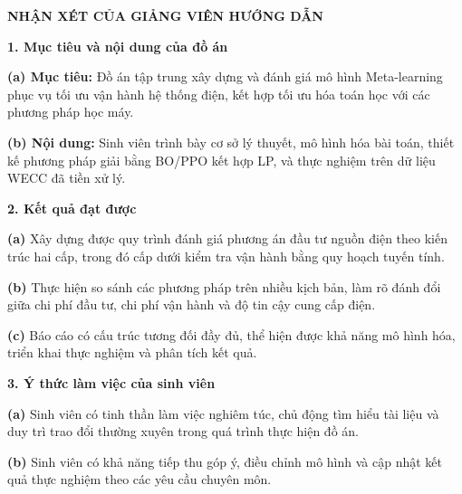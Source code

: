 \documentclass[12pt, a4paper]{report}
\begin{document}
\newpage
\thispagestyle{empty}

\vspace*{1.4cm}
\begin{center}
  {\fontsize{14}{17}\selectfont\bfseries NHẬN XÉT CỦA GIẢNG VIÊN HƯỚNG DẪN}
\end{center}
\vspace{0.5cm}

\begingroup
{}
\setlength{\parindent}{0pt}
\small

\textbf{1. Mục tiêu và nội dung của đồ án}

\hspace*{0.7cm}\textbf{(a) Mục tiêu:} Đồ án tập trung xây dựng và đánh giá mô hình Meta-learning phục vụ tối ưu vận hành hệ thống điện, kết hợp tối ưu hóa toán học với các phương pháp học máy.

\hspace*{0.7cm}\textbf{(b) Nội dung:} Sinh viên trình bày cơ sở lý thuyết, mô hình hóa bài toán, thiết kế phương pháp giải bằng BO/PPO kết hợp LP, và thực nghiệm trên dữ liệu WECC đã tiền xử lý.

\vspace{0.25cm}
\textbf{2. Kết quả đạt được}

\hspace*{0.7cm}\textbf{(a)} Xây dựng được quy trình đánh giá phương án đầu tư nguồn điện theo kiến trúc hai cấp, trong đó cấp dưới kiểm tra vận hành bằng quy hoạch tuyến tính.

\hspace*{0.7cm}\textbf{(b)} Thực hiện so sánh các phương pháp trên nhiều kịch bản, làm rõ đánh đổi giữa chi phí đầu tư, chi phí vận hành và độ tin cậy cung cấp điện.

\hspace*{0.7cm}\textbf{(c)} Báo cáo có cấu trúc tương đối đầy đủ, thể hiện được khả năng mô hình hóa, triển khai thực nghiệm và phân tích kết quả.

\vspace{0.25cm}
\textbf{3. Ý thức làm việc của sinh viên}

\hspace*{0.7cm}\textbf{(a)} Sinh viên có tinh thần làm việc nghiêm túc, chủ động tìm hiểu tài liệu và duy trì trao đổi thường xuyên trong quá trình thực hiện đồ án.

\hspace*{0.7cm}\textbf{(b)} Sinh viên có khả năng tiếp thu góp ý, điều chỉnh mô hình và cập nhật kết quả thực nghiệm theo các yêu cầu chuyên môn.
\end{document}
